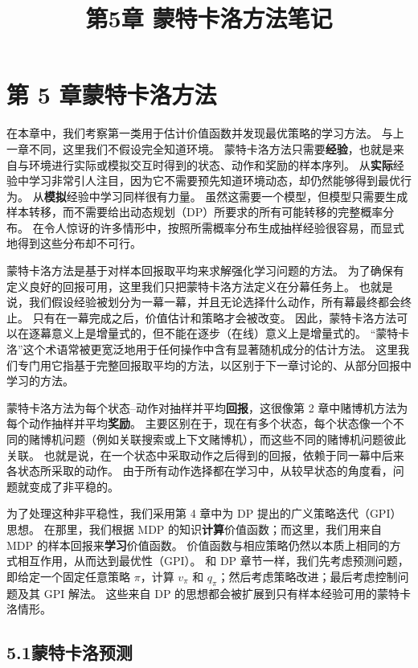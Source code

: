 \documentclass[UTF8,12pt,a4paper,fontset=fandol]{ctexart}
\title{第5章 蒙特卡洛方法笔记}
\author{}
\date{}
\begin{document}
\maketitle

\section*{第 5 章\quad 蒙特卡洛方法}

在本章中，我们考察第一类用于估计价值函数并发现最优策略的学习方法。
与上一章不同，这里我们不假设完全知道环境。
蒙特卡洛方法只需要\textbf{经验}，也就是来自与环境进行实际或模拟交互时得到的状态、动作和奖励的样本序列。
从\textbf{实际}经验中学习非常引人注目，因为它不需要预先知道环境动态，却仍然能够得到最优行为。
从\textbf{模拟}经验中学习同样很有力量。
虽然这需要一个模型，但模型只需要生成样本转移，而不需要给出动态规划（DP）所要求的所有可能转移的完整概率分布。
在令人惊讶的许多情形中，按照所需概率分布生成抽样经验很容易，而显式地得到这些分布却不可行。

蒙特卡洛方法是基于对样本回报取平均来求解强化学习问题的方法。
为了确保有定义良好的回报可用，这里我们只把蒙特卡洛方法定义在分幕任务上。
也就是说，我们假设经验被划分为一幕一幕，并且无论选择什么动作，所有幕最终都会终止。
只有在一幕完成之后，价值估计和策略才会被改变。
因此，蒙特卡洛方法可以在逐幕意义上是增量式的，但不能在逐步（在线）意义上是增量式的。
“蒙特卡洛”这个术语常被更宽泛地用于任何操作中含有显著随机成分的估计方法。
这里我们专门用它指基于完整回报取平均的方法，以区别于下一章讨论的、从部分回报中学习的方法。

蒙特卡洛方法为每个状态--动作对抽样并平均\textbf{回报}，这很像第 2 章中赌博机方法为每个动作抽样并平均\textbf{奖励}。
主要区别在于，现在有多个状态，每个状态像一个不同的赌博机问题（例如关联搜索或上下文赌博机），而这些不同的赌博机问题彼此关联。
也就是说，在一个状态中采取动作之后得到的回报，依赖于同一幕中后来各状态所采取的动作。
由于所有动作选择都在学习中，从较早状态的角度看，问题就变成了非平稳的。

为了处理这种非平稳性，我们采用第 4 章中为 DP 提出的广义策略迭代（GPI）思想。
在那里，我们根据 MDP 的知识\textbf{计算}价值函数；而这里，我们用来自 MDP 的样本回报来\textbf{学习}价值函数。
价值函数与相应策略仍然以本质上相同的方式相互作用，从而达到最优性（GPI）。
和 DP 章节一样，我们先考虑预测问题，即给定一个固定任意策略 $\pi$，计算 $v_\pi$ 和 $q_\pi$；然后考虑策略改进；最后考虑控制问题及其 GPI 解法。
这些来自 DP 的思想都会被扩展到只有样本经验可用的蒙特卡洛情形。

\subsection*{5.1\quad 蒙特卡洛预测}
\end{document}
